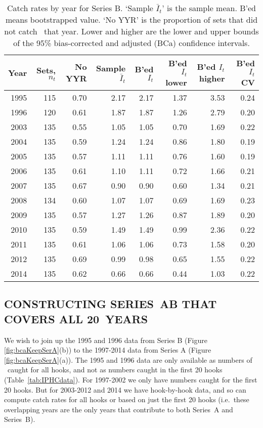 \begin{table}[tbp]
\centering
\caption{Catch rates by year for Series B.
     `Sample $\bar{I}_t$' is the sample mean. B'ed means bootstrapped 
     value. `No YYR' is the proportion of sets that did not catch \spName~that
     year. Lower and higher are the 
     lower and upper bounds of the 95\% bias-corrected and adjusted (BCa)
     confidence intervals.} 
\label{tab:bcaKeepSerB}
\begin{tabular}{rrrrrrrr}
  \hline
Year & Sets, $n_t$ & No YYR & Sample $\bar{I}_t$ & B'ed $I_t$ & B'ed $I_t$ lower & B'ed $I_t$ higher & B'ed $I_t$ CV \\ 
  \hline
1995 & 115 & 0.70 & 2.17 & 2.17 & 1.37 & 3.53 & 0.24 \\ 
  1996 & 120 & 0.61 & 1.87 & 1.87 & 1.26 & 2.79 & 0.20 \\ 
  2003 & 135 & 0.55 & 1.05 & 1.05 & 0.70 & 1.69 & 0.22 \\ 
  2004 & 135 & 0.59 & 1.24 & 1.24 & 0.86 & 1.80 & 0.19 \\ 
  2005 & 135 & 0.57 & 1.11 & 1.11 & 0.76 & 1.60 & 0.19 \\ 
  2006 & 135 & 0.61 & 1.10 & 1.11 & 0.72 & 1.66 & 0.21 \\ 
  2007 & 135 & 0.67 & 0.90 & 0.90 & 0.60 & 1.34 & 0.21 \\ 
  2008 & 134 & 0.60 & 1.07 & 1.07 & 0.69 & 1.69 & 0.23 \\ 
  2009 & 135 & 0.57 & 1.27 & 1.26 & 0.87 & 1.89 & 0.20 \\ 
  2010 & 135 & 0.59 & 1.49 & 1.49 & 0.99 & 2.36 & 0.22 \\ 
  2011 & 135 & 0.61 & 1.06 & 1.06 & 0.73 & 1.58 & 0.20 \\ 
  2012 & 135 & 0.69 & 0.99 & 0.98 & 0.65 & 1.55 & 0.22 \\ 
  2014 & 135 & 0.62 & 0.66 & 0.66 & 0.44 & 1.03 & 0.22 \\ 
   \hline
\end{tabular}
\end{table}%

\clearpage

\subsection{CONSTRUCTING SERIES~AB THAT COVERS ALL 20~YEARS}

We wish to join up the 1995 and 1996 data from Series B (Figure
\ref{fig:bcaKeepSerA}(b)) to the 1997-2014 data from Series A (Figure
\ref{fig:bcaKeepSerA}(a)). The 1995 and 1996 data are only available as numbers
of \spName~caught for all hooks, and not as numbers caught in the first 20 hooks
(Table~\ref{tab:IPHCdata}). For 1997-2002 we only have numbers caught for the
first 20 hooks. But for 2003-2012 and 2014 we have hook-by-hook data, and so can
compute catch rates for all hooks or based on just the first 20 hooks
(i.e.~these overlapping years are the only years that contribute to both
Series~A and Series~B).

